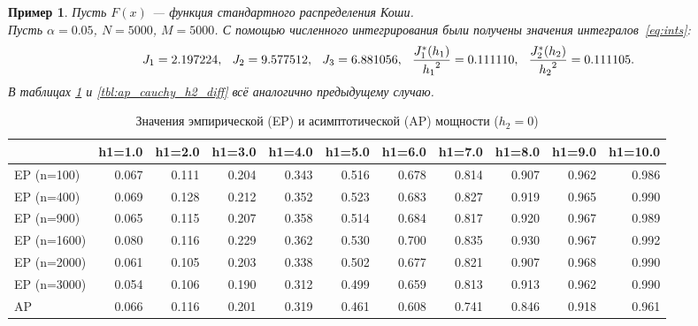 \documentclass[12pt]{article}
\theoremstyle{break}
\newtheorem{example}{Пример}
\begin{document}
\newpage


\begin{example}
	Пусть $F(x)$ --- функция стандартного распределения Коши.\\
	Пусть $\alpha = 0.05$, $N=5000$, $M=5000$.
	С помощью численного интегрирования были получены значения интегралов~\eqref{eq:ints}:
	\begin{equation*}
		J_1 = 2.197224, \hspace{0.1in} J_2 = 9.577512, \hspace{0.1in}  J_3=6.881056, \hspace{0.1in}
		\frac{J^{*}_1(h_1)}{{h_1}^2} = 0.111110,   \hspace{0.1in} \frac{J^{*}_2(h_2)}{{h_2}^2} = 0.111105.
	\end{equation*}
	В таблицах  \ref{tbl:ap_cauchy_h1_diff} и \ref{tbl:ap_cauchy_h2_diff} всё аналогично предыдущему случаю.
\end{example}


\begin{table}[!h]
	\centering
	\caption{Значения эмпирической (EP) и асимптотической (AP) мощности ($h_2=0$)}
	\centering
	\hspace*{-1.0cm}\begin{tabular}
		[t]{lrrrrrrrrrr}
		\toprule
		& h1=1.0 & h1=2.0 & h1=3.0 & h1=4.0 & h1=5.0 & h1=6.0 & h1=7.0 & h1=8.0 & h1=9.0 & h1=10.0\\
		\midrule
		EP (n=100) & 0.067 & 0.111 & 0.204 & 0.343 & 0.516 & 0.678 & 0.814 & 0.907 & 0.962 & 0.986\\
		EP (n=400) & 0.069 & 0.128 & 0.212 & 0.352 & 0.523 & 0.683 & 0.827 & 0.919 & 0.965 & 0.990\\
		EP (n=900) & 0.065 & 0.115 & 0.207 & 0.358 & 0.514 & 0.684 & 0.817 & 0.920 & 0.967 & 0.989\\
		EP (n=1600) & 0.080 & 0.116 & 0.229 & 0.362 & 0.530 & 0.700 & 0.835 & 0.930 & 0.967 & 0.992\\
		EP (n=2000) & 0.061 & 0.105 & 0.203 & 0.338 & 0.502 & 0.677 & 0.821 & 0.907 & 0.968 & 0.990\\
		EP (n=3000) & 0.054 & 0.106 & 0.190 & 0.312 & 0.499 & 0.659 & 0.813 & 0.913 & 0.962 & 0.990\\
		\addlinespace
		AP & 0.066 & 0.116 & 0.201 & 0.319 & 0.461 & 0.608 & 0.741 & 0.846 & 0.918 & 0.961\\
		\bottomrule
	\end{tabular}
	\label{tbl:ap_cauchy_h1_diff}
\end{table}
\end{document}
